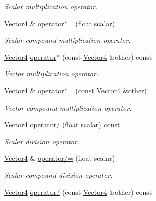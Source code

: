 \begin{DoxyCompactItemize}
\begin{DoxyCompactList}\small\item\em Scalar multiplication operator. \end{DoxyCompactList}\item 
\hyperlink{classchaos_1_1gfx_1_1_vector4}{Vector4} \& \hyperlink{classchaos_1_1gfx_1_1_vector4_ae171d478578a7a1564ca3e869da3b3f8}{operator$\ast$=} (float scalar)
\begin{DoxyCompactList}\small\item\em Scalar compound multiplication operator. \end{DoxyCompactList}\item 
\hyperlink{classchaos_1_1gfx_1_1_vector4}{Vector4} \hyperlink{classchaos_1_1gfx_1_1_vector4_a4f669aee39927f0953a445342754bf81}{operator$\ast$} (const \hyperlink{classchaos_1_1gfx_1_1_vector4}{Vector4} \&other) const 
\begin{DoxyCompactList}\small\item\em Vector multiplication operator. \end{DoxyCompactList}\item 
\hyperlink{classchaos_1_1gfx_1_1_vector4}{Vector4} \& \hyperlink{classchaos_1_1gfx_1_1_vector4_a5e9b011fc9fed1e3d9c8aaaf0ace80de}{operator$\ast$=} (const \hyperlink{classchaos_1_1gfx_1_1_vector4}{Vector4} \&other)
\begin{DoxyCompactList}\small\item\em Vector compound multiplication operator. \end{DoxyCompactList}\item 
\hyperlink{classchaos_1_1gfx_1_1_vector4}{Vector4} \hyperlink{classchaos_1_1gfx_1_1_vector4_accffe88c758a09b13b68ee1692663de9}{operator/} (float scalar) const 
\begin{DoxyCompactList}\small\item\em Scalar division operator. \end{DoxyCompactList}\item 
\hyperlink{classchaos_1_1gfx_1_1_vector4}{Vector4} \& \hyperlink{classchaos_1_1gfx_1_1_vector4_a1ce1c817fbc1999faeb34d08f4df284b}{operator/=} (float scalar)
\begin{DoxyCompactList}\small\item\em Scalar compound division operator. \end{DoxyCompactList}\item 
\hyperlink{classchaos_1_1gfx_1_1_vector4}{Vector4} \hyperlink{classchaos_1_1gfx_1_1_vector4_a49903452ff2a9748523e035227d27e6f}{operator/} (const \hyperlink{classchaos_1_1gfx_1_1_vector4}{Vector4} \&other) const 

\end{DoxyCompactItemize}
